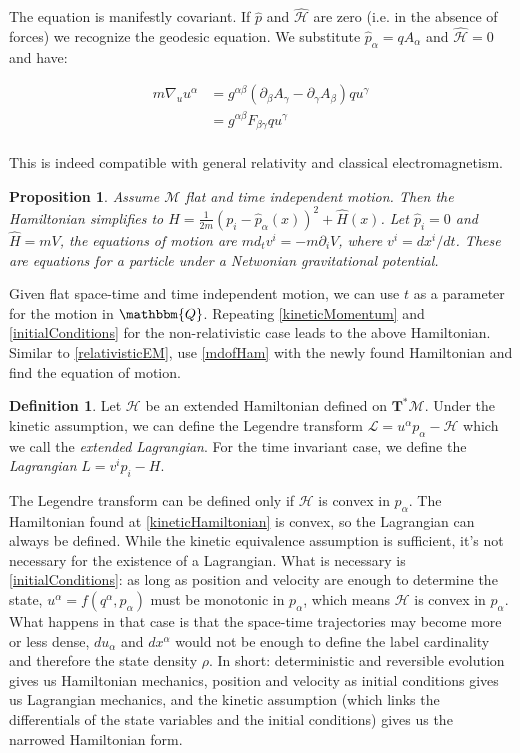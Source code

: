 \documentclass[aps,pra,10pt,twocolumn,floatfix,nofootinbib]{revtex4-1}
\newtheorem{prop}[thm]{Proposition}
\theoremstyle{definition}
\newtheorem{defn}[thm]{Definition}
\begin{document}
The equation is manifestly covariant. If $\hat{p}$ and $\hat{\mathcal{H}}$ are zero (i.e. in the absence of forces) we recognize the geodesic equation. We substitute $\hat{p}_\alpha = q A_\alpha$ and $\hat{\mathcal{H}} = 0$ and have:

\begin{align*}
m \nabla_{u} u^\alpha &= g^{\alpha\beta} (\partial_\beta A_\gamma - \partial_\gamma A_\beta ) q u^\gamma \\
&= g^{\alpha\beta} F_{\beta \gamma} q u^\gamma\\
\end{align*}

This is indeed compatible with general relativity and classical electromagnetism.

\begin{prop}\label{newtonianGravitation}
Assume $\mathcal{M}$ flat and time independent motion. Then the Hamiltonian simplifies to $H=\frac{1}{2m}(p_i-\hat{p}_\alpha(x))^2+\hat{H}(x)$. Let $\hat{p}_i = 0$ and $\hat{H} = mV$, the equations of motion are $m d_t v^i = - m \partial_i V$, where $v^i=dx^i/dt$. These are equations for a particle under a Netwonian gravitational potential.
\end{prop}

Given flat space-time and time independent motion, we can use $t$ as a parameter for the motion in $\mathbbm{Q}$. Repeating \ref{kineticMomentum} and \ref{initialConditions} for the non-relativistic case leads to the above Hamiltonian. Similar to \ref{relativisticEM}, use \ref{mdofHam} with the newly found Hamiltonian and find the equation of motion.

\begin{defn}\label{lagrangian}
Let $\mathcal{H}$ be an extended Hamiltonian defined on $\mathbf{T}^*\mathcal{M}$. Under the kinetic assumption, we can define the Legendre transform $\mathcal{L}=u^\alpha p_\alpha - \mathcal{H}$ which we call the \emph{extended Lagrangian}. For the time invariant case, we define the \emph{Lagrangian} $L=v^i p_i - H$.
\end{defn}

The Legendre transform can be defined only if $\mathcal{H}$ is convex in $p_\alpha$. The Hamiltonian found at \ref{kineticHamiltonian} is convex, so the Lagrangian can always be defined. While the kinetic equivalence assumption is sufficient, it's not necessary for the existence of a Lagrangian. What is necessary is \ref{initialConditions}: as long as position and velocity are enough to determine the state, $u^\alpha=f(q^\alpha, p_\alpha)$ must be monotonic in $p_\alpha$, which means $\mathcal{H}$ is convex in $p_\alpha$. What happens in that case is that the space-time trajectories may become more or less dense, $du_\alpha$ and $dx^\alpha$ would not be enough to define the label cardinality and therefore the state density $\rho$. In short: deterministic and reversible evolution gives us Hamiltonian mechanics, position and velocity as initial conditions gives us Lagrangian mechanics, and the kinetic assumption (which links the differentials of the state variables and the initial conditions) gives us the narrowed Hamiltonian form.
\end{document}
